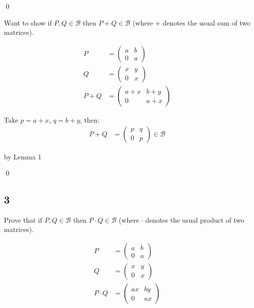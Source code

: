 \documentclass[12pt]{article}
\begin{document}
\qed{}

Want to show if $P,Q \in \mathcal{B}$ then $P + Q \in \mathcal{B}$ (where $+$ denotes the usual sum of two matrices).

\begin{align*}
P &= \begin{pmatrix}
a & b \\
0 & a
\end{pmatrix} \\
Q &= \begin{pmatrix}
x & y \\
0 & x
\end{pmatrix} \\
P + Q &= \begin{pmatrix}
a + x & b + y \\
0 & a + x
\end{pmatrix}
\end{align*}

Take $p = a + x$, $q = b + y$, then: \\

\begin{align*}
P + Q &= \begin{pmatrix}
p & q \\
0 & p
\end{pmatrix} \in \mathcal{B}
\end{align*}

by Lemma 1

\qed{}

\subsection*{3}

Prove that if $P,Q \in \mathcal{B}$ then $P \cdot Q \in \mathcal{B}$ (where $\cdot$ denotes the usual product of two matrices).

\begin{align*}
P &= \begin{pmatrix}
a & b \\
0 & a
\end{pmatrix} \\
Q &= \begin{pmatrix}
x & y \\
0 & x
\end{pmatrix} \\
P \cdot Q &= \begin{pmatrix}
a x & b y \\
0 & a x
\end{pmatrix}
\end{align*}
\end{document}
